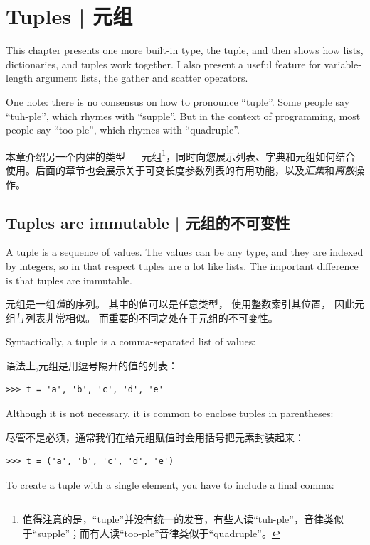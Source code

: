 \chapter{Tuples | 元组}
\label{tuplechap}

This chapter presents one more built-in type, the tuple, and then
shows how lists, dictionaries, and tuples work together.
I also present a useful feature for variable-length argument lists,
the gather and scatter operators.

One note: there is no consensus on how to pronounce ``tuple''.
Some people say ``tuh-ple'', which rhymes with ``supple''.  But
in the context of programming, most people say ``too-ple'', which
rhymes with ``quadruple''.

本章介绍另一个内建的类型 --- 元组\footnote{值得注意的是，``tuple''并没有统一的发音，有些人读``tuh-ple''，音律类似于``supple''；而有人读``too-ple''音律类似于``quadruple''。}，同时向您展示列表、字典和元组如何结合使用。后面的章节也会展示关于可变长度参数列表的有用功能，以及\emph{汇集}和\emph{离散}操作。

\section{Tuples are immutable | 元组的不可变性}
    

A tuple is a sequence of values.  The values can be any type, and
they are indexed by integers, so in that respect tuples are a lot
like lists.  The important difference is that tuples are immutable.
  

元组是一组\emph{值}的序列。
其中的值可以是任意类型， 使用整数索引其位置， 因此元组与列表非常相似。 而重要的不同之处在于元组的不可变性。

Syntactically, a tuple is a comma-separated list of values:

语法上,元组是用逗号隔开的值的列表：

\begin{lstlisting}
>>> t = 'a', 'b', 'c', 'd', 'e'
\end{lstlisting}
%
Although it is not necessary, it is common to enclose tuples in
parentheses:

尽管不是必须，通常我们在给元组赋值时会用括号把元素封装起来：


\begin{lstlisting}
>>> t = ('a', 'b', 'c', 'd', 'e')
\end{lstlisting}
%
To create a tuple with a single element, you have to include a final
comma:

